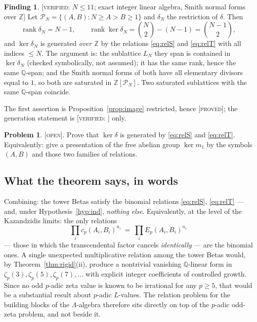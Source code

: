\documentclass[11pt,reqno]{article}
\newcommand{\QQ}{\mathbb{Q}}
\newcommand{\ZZ}{\mathbb{Z}}
\newcommand{\Pset}{\mathcal{P}}
\DeclareMathOperator{\rank}{rank}
\newcommand{\PROVED}{{\normalfont\textsc{[proved]}}}
\newcommand{\VER}[1]{{\normalfont\textsc{[verified:} #1\textsc{]}}}
\newcommand{\OPENTAG}{{\normalfont\textsc{[open]}}}
\theoremstyle{plain}
\theoremstyle{definition}
\newtheorem{finding}[theorem]{Finding}
\newtheorem{problem}[theorem]{Problem}
\theoremstyle{remark}
\numberwithin{equation}{section}
\begin{document}
\begin{finding}\label{find:lattice}
\VER{$N\le11$; exact integer linear algebra, Smith normal forms over $\ZZ$}
Let $\Pset_N=\{(A,B):N\ge A>B\ge1\}$ and $\delta_N$ the restriction of $\delta$.
Then
\[
  \rank\delta_N=N-1,\qquad
  \rank\ker\delta_N=\binom{N}{2}-(N-1)=\binom{N-1}{2},
\]
and $\ker\delta_N$ is generated \emph{over $\ZZ$} by the relations
\eqref{eq:relS} and \eqref{eq:relT} with all indices $\le N$.  The argument is:
the sublattice $L_N$ they span is contained in $\ker\delta_N$ (checked
symbolically, not assumed); it has the same rank, hence the same $\QQ$-span; and
the Smith normal forms of both have all elementary divisors equal to $1$, so both
are saturated in $\ZZ[\Pset_N]$.  Two saturated sublattices with the same
$\QQ$-span coincide.
\end{finding}

The first assertion is Proposition~\ref{prop:image} restricted, hence
\PROVED; the generation statement is \VER{} only.

\begin{problem}\label{prob:gen}
\OPENTAG.  Prove that $\ker\delta$ is generated by \eqref{eq:relS} and
\eqref{eq:relT}.  Equivalently: give a presentation of the free abelian group
$\ker m_1$ by the symbols $(A,B)$ and those two families of relations.
\end{problem}

\subsection{What the theorem says, in words}

Combining: the tower Betas satisfy the binomial relations \eqref{eq:relS},
\eqref{eq:relT} --- and, under Hypothesis~\ref{hyp:ind}, \emph{nothing else}.
Equivalently, at the level of the Kazandzidis limits: the only relations
\[
  \prod_ic_p(A_i,B_i)^{n_i}\ =\ \prod_iE_p(A_i,B_i)^{n_i}
\]
--- those in which the transcendental factor cancels \emph{identically} --- are
the binomial ones.  A single unexpected multiplicative relation among the tower
Betas would, by Theorem~\ref{thm:rigid}(ii), produce a nontrivial vanishing
$\QQ$-linear form in $\zeta_p(3),\zeta_p(5),\zeta_p(7),\dots$ with explicit
integer coefficients of controlled growth.  Since no odd $p$-adic zeta value is
known to be irrational for any $p\ge5$, that would be a substantial result about
$p$-adic $L$-values.  The relation problem for the building blocks of the
$\Lambda$-algebra therefore sits directly on top of the $p$-adic odd-zeta
problem, and not beside it.
\end{document}
